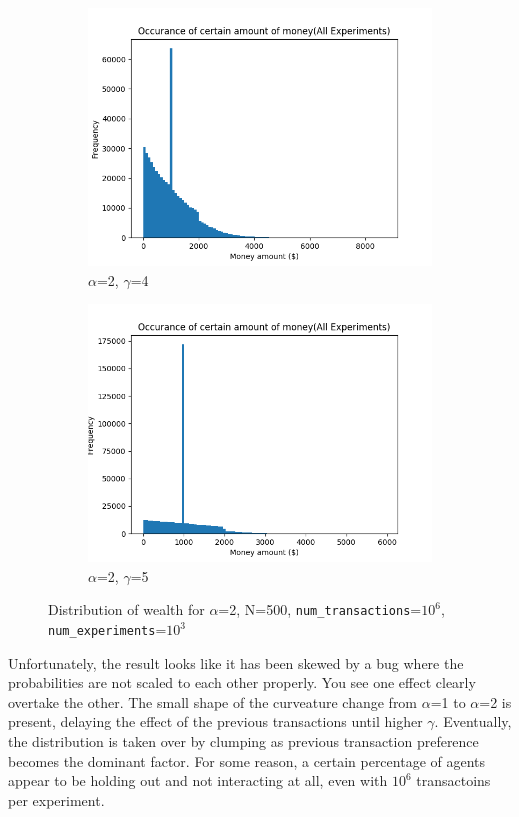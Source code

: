 \documentclass[12pt]{article} %
\begin{document}
\begin{figure}[h!]
\begin{subfigure}{\scaleTextWidth\textwidth}
		\includegraphics[scale=\scaleResultsA]{a2g4.png}
		\caption{$\alpha$=2, $\gamma$=4}
		\label{fig:a2g4}
	\end{subfigure}
	\begin{subfigure}{\scaleTextWidth\textwidth}
		\includegraphics[scale=\scaleResultsA]{a2g5.png}
		\caption{$\alpha$=2, $\gamma$=5}
		\label{fig:a2g5}
	\end{subfigure}
	\caption{Distribution of wealth for $\alpha$=2, N=500,
	\texttt{num\_transactions}=$10^6$, \texttt{num\_experiments}=$10^3$}
\end{figure}

Unfortunately, the result looks like it has been skewed by a bug where the probabilities are not scaled to each other properly.
You see one effect clearly overtake the other. The small shape of the
curveature change from $\alpha$=1 to $\alpha$=2 is present, delaying the effect
of the previous transactions until higher $\gamma$. Eventually, the
distribution is taken over by clumping as previous transaction preference
becomes the dominant factor. For some reason, a certain percentage of agents
appear to be holding out and not interacting at all, even with $10^6$
transactoins per experiment.
\end{document}
